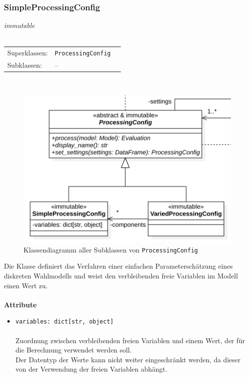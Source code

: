 \documentclass{article}
\begin{document}
\newpage
\subsubsection*{\large{\textbf{SimpleProcessingConfig}\label{cls:SimpleProcessingConfig}}}
\textit{\flqq{}immutable\frqq}\normalsize\\\\
\begin{tabular}{lll}
 Superklassen: & \texttt{ProcessingConfig}\\
 Subklassen: & --
\end{tabular}\\
\begin{figure}[H]%
    \centering
    \includegraphics[width=13cm]{entwurf/Entwurf_dokument/img/cls/model/ProcessingConfigs.png}
    \caption{Klassendiagramm aller Subklassen von \texttt{ProcessingConfig}}
\end{figure}

Die Klasse definiert das Verfahren einer einfachen Parameterschätzung eines diskreten Wahlmodells und weist den verbleibenden freie Variablen im Modell einen Wert zu.
\\\\

\textbf{Attribute}
\begin{itemize}\setlength\itemsep{3em}
\item \texttt{variables: dict[str, object]}\\\\
Zuordnung zwischen verbleibenden freien Variablen und einem Wert, der für die Berechnung verwendet werden soll.\\
Der Datentyp der Werte kann nicht weiter eingeschränkt werden, da dieser von der Verwendung der freien Variablen abhängt.
\\\\
\end{itemize}
\end{document}
